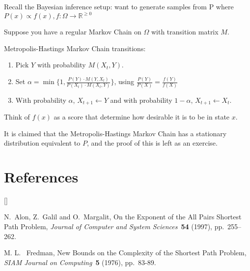 \documentclass[twoside]{article}
\def\beginrefs{\begin{list}%
        {[\arabic{equation}]}{\usecounter{equation}
         \setlength{\leftmargin}{2.0truecm}\setlength{\labelsep}{0.4truecm}%
         \setlength{\labelwidth}{1.6truecm}}}
\def\endrefs{\end{list}}
\def\bibentry#1{\item[\hbox{[#1]}]}
\begin{document}
Recall the Bayesian inference setup: want to generate samples from P where $P(x) \propto f(x), f: \Omega \rightarrow \mathbb{R}^{\geq 0}$

Suppose you have a regular Markov Chain on $\Omega$ with transition matrix $M$.

Metropolis-Hastings Markov Chain transitions:

\begin{enumerate}
   \item Pick $Y$ with probability $M(X_t, Y)$.
   \item Set $\alpha = \min\{ 1, \frac{P(Y) \cdot M(Y, X_t)}{P(X_t) \cdot M(X_t, Y)} \}$, using $\frac{P(Y)}{P(X)} = \frac{f(Y)}{f(X)}$
   \item With probability $\alpha$, $X_{t+1} \leftarrow Y$ and with probability $1 - \alpha$, $X_{t+1} \leftarrow X_t$.
\end{enumerate}

Think of $f(x)$ as a score that determine how desirable it is to be in state $x$.

It is claimed that the Metropolis-Hastings Markov Chain has a stationary distribution equivalent to $P$, and the proof of this is left as an exercise.

\section*{References}
\beginrefs
\bibentry{AGM97}{\sc N.~Alon}, {\sc Z.~Galil} and {\sc O.~Margalit},
On the Exponent of the All Pairs Shortest Path Problem,
{\it Journal of Computer and System Sciences\/}~{\bf 54} (1997),
pp.~255--262.

\bibentry{F76}{\sc M. L. ~Fredman}, New Bounds on the Complexity of the 
Shortest Path Problem, {\it SIAM Journal on Computing\/}~{\bf 5} (1976), 
pp.~83-89.
\endrefs
\end{document}
